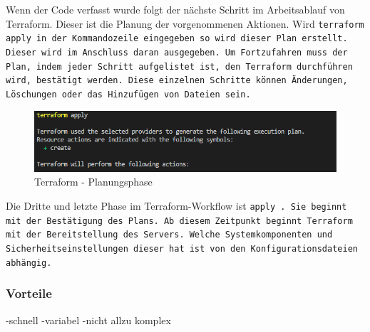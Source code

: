 \begin{otherlanguage}{ngerman}
\newline
Wenn der Code verfasst wurde folgt der nächste Schritt im Arbeitsablauf von Terraform. Dieser ist die Planung der vorgenommenen Aktionen. Wird \tt terraform apply \rm in der Kommandozeile eingegeben so wird dieser Plan erstellt. Dieser wird im Anschluss daran ausgegeben. Um Fortzufahren muss der Plan, indem jeder Schritt aufgelistet ist, den Terraform durchführen wird, bestätigt werden. Diese einzelnen Schritte können Änderungen, Löschungen oder das Hinzufügen von Dateien sein.
\begin{figure}
    \centering
    \includegraphics{LaTeX/graphic/terraformapply.png}
    \caption{Terraform - Planungsphase}
\end{figure}

\newpage 
Die Dritte und letzte Phase im Terraform-Workflow ist \tt apply \rm. Sie beginnt mit der Bestätigung des Plans. Ab diesem Zeitpunkt beginnt Terraform mit der Bereitstellung des Servers. Welche Systemkomponenten und Sicherheitseinstellungen dieser hat ist von den Konfigurationsdateien abhängig. 
\newpage
\subsubsection{Vorteile}
-schnell
\newline
-variabel
\newline
-nicht allzu komplex
\end{otherlanguage}